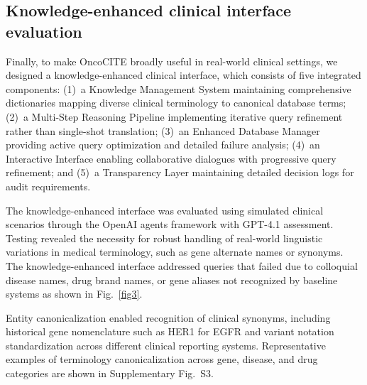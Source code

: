 % 
%
%

\subsection{Knowledge-enhanced clinical interface evaluation}\label{subsec5}

Finally, to make OncoCITE broadly useful in real-world clinical settings, we designed a knowledge-enhanced clinical interface, which consists of five integrated components: (1)~a Knowledge Management System maintaining comprehensive dictionaries mapping diverse clinical terminology to canonical database terms; (2)~a Multi-Step Reasoning Pipeline implementing iterative query refinement rather than single-shot translation; (3)~an Enhanced Database Manager providing active query optimization and detailed failure analysis; (4)~an Interactive Interface enabling collaborative dialogues with progressive query refinement; and (5)~a Transparency Layer maintaining detailed decision logs for audit requirements.

The knowledge-enhanced interface was evaluated using simulated clinical scenarios through the OpenAI agents framework with GPT-4.1 assessment. Testing revealed the necessity for robust handling of real-world linguistic variations in medical terminology, such as gene alternate names or synonyms. The knowledge-enhanced interface addressed queries that failed due to colloquial disease names, drug brand names, or gene aliases not recognized by baseline systems as shown in Fig.~\ref{fig3}.

Entity canonicalization enabled recognition of clinical synonyms, including historical gene nomenclature such as HER1 for EGFR and variant notation standardization across different clinical reporting systems. Representative examples of terminology canonicalization across gene, disease, and drug categories are shown in Supplementary Fig.~S3.

